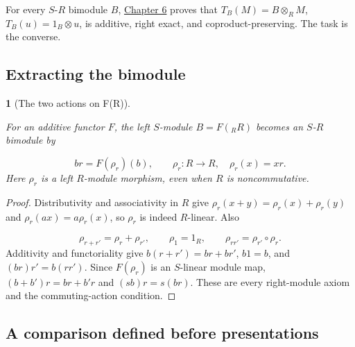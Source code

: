 \documentclass[11pt,a4paper]{article}
\newcommand{\mathheading}{}
\theoremstyle{plain}
\newtheorem*{plainstatement}{\mathheading}
\theoremstyle{definition}
\newenvironment{mathstatement}[3]{\renewcommand{\mathheading}{#1 #2}\begin{plainstatement}[#3]}{\end{plainstatement}}
\begin{document}
 
\par{}\par
 
For every \(S\)-\(R\) bimodule \(B\), \hyperref[chapter-06]{Chapter 6} proves that \(T_B(M)=B\otimes_R M\), \(T_B(u)=1_B\otimes u\), is additive, right exact, and coproduct-preserving. The task is the converse.

 
\subsection{Extracting the bimodule}
\label{kernel}
 
\begin{mathstatement}{Lemma}{9.2}{The two actions on F(R)}
\label{env-9-2}

For an additive functor \(F\), the left \(S\)-module \(B=F({}_R R)\) becomes an \(S\)-\(R\) bimodule by

 \[b r=F(\rho_r)(b),\qquad \rho_r:R\to R,\quad \rho_r(x)=xr.\] 
Here \(\rho_r\) is a left \(R\)-module morphism, even when \(R\) is noncommutative.


\par{}\par

\end{mathstatement}
 
\begin{proof}

Distributivity and associativity in \(R\) give \(\rho_r(x+y)=\rho_r(x)+\rho_r(y)\) and \(\rho_r(ax)=a\rho_r(x)\), so \(\rho_r\) is indeed \(R\)-linear. Also

 \[\rho_{r+r'}=\rho_r+\rho_{r'},\qquad \rho_1=1_R,\qquad \rho_{rr'}=\rho_{r'}\circ\rho_r.\] 
Additivity and functoriality give \(b(r+r')=br+br'\), \(b1=b\), and \((br)r'=b(rr')\). Since \(F(\rho_r)\) is an \(S\)-linear module map, \((b+b')r=br+b'r\) and \((sb)r=s(br)\). These are every right-module axiom and the commuting-action condition.


\end{proof}
 
\subsection{A comparison defined before presentations}
\label{comparison}
\end{document}
